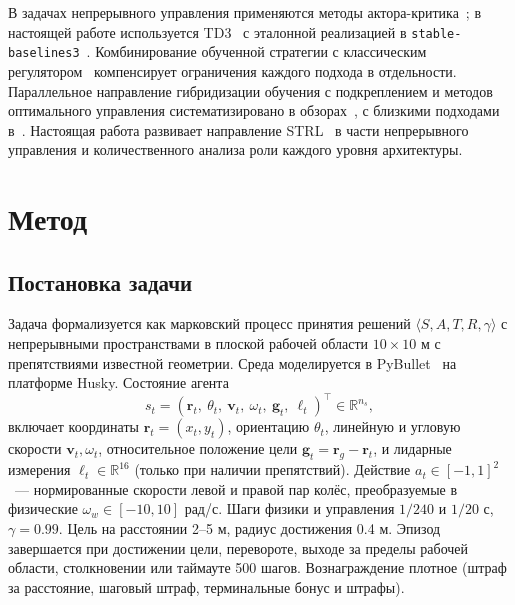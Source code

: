 \documentclass[11pt]{article}
\begin{document}
В задачах непрерывного управления применяются методы актора-критика~\cite{lillicrap2016ddpg,fujimoto2018td3,haarnoja2018sac,schulman2017ppo}; в настоящей работе используется TD3~\cite{fujimoto2018td3} с эталонной реализацией в \verb|stable-baselines3|~\cite{raffin2021sb3}. Комбинирование обученной стратегии с классическим регулятором~\cite{silver2018residual,johannink2019residual} компенсирует ограничения каждого подхода в отдельности. Параллельное направление гибридизации обучения с подкреплением и методов оптимального управления систематизировано в обзорах~\cite{hewing2020lbmpc,brunke2022safe}, с близкими подходами в~\cite{levine2016end,cheng2019control,kahn2018selfsup}. Настоящая работа развивает направление STRL~\cite{gat1998three,kiselev2020dissertation,kiselev2020,veitsenfeld2024} в части непрерывного управления и количественного анализа роли каждого уровня архитектуры.

\section{Метод}
\label{sec:method}

\subsection{Постановка задачи}
\label{sec:problem}

Задача формализуется как марковский процесс принятия решений $\langle S, A, T, R, \gamma \rangle$ с непрерывными пространствами в плоской рабочей области $10 \times 10$ м с препятствиями известной геометрии. Среда моделируется в PyBullet~\cite{coumans2021pybullet} на платформе Husky. Состояние агента
\begin{equation}
s_t = (\mathbf{r}_t,\ \theta_t,\ \mathbf{v}_t,\ \omega_t,\ \mathbf{g}_t,\ \ell_t)^\top \in \mathbb{R}^{n_s},
\end{equation}
включает координаты $\mathbf{r}_t = (x_t, y_t)$, ориентацию $\theta_t$, линейную и угловую скорости $\mathbf{v}_t, \omega_t$, относительное положение цели $\mathbf{g}_t = \mathbf{r}_g - \mathbf{r}_t$, и лидарные измерения $\ell_t \in \mathbb{R}^{16}$ (только при наличии препятствий). Действие $a_t \in [-1, 1]^2$~--- нормированные скорости левой и правой пар колёс, преобразуемые в физические $\omega_w \in [-10, 10]$ рад/с. Шаги физики и управления $1/240$ и $1/20$ с, $\gamma = 0.99$. Цель на расстоянии 2--5 м, радиус достижения 0.4 м. Эпизод завершается при достижении цели, перевороте, выходе за пределы рабочей области, столкновении или таймауте 500 шагов. Вознаграждение плотное (штраф за расстояние, шаговый штраф, терминальные бонус и штрафы).
\end{document}
